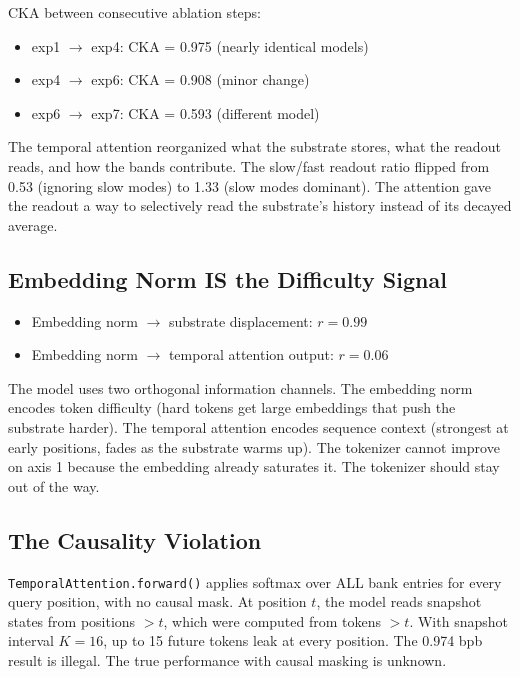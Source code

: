 \documentclass[11pt,a4paper]{report}
\begin{document}
CKA between consecutive ablation steps:

\begin{itemize}[nosep]
\item exp1 $\to$ exp4: CKA = 0.975 (nearly identical models)
\item exp4 $\to$ exp6: CKA = 0.908 (minor change)
\item exp6 $\to$ exp7: CKA = 0.593 (different model)
\end{itemize}

The temporal attention reorganized what the substrate stores, what the readout reads, and how the bands contribute. The slow/fast readout ratio flipped from 0.53 (ignoring slow modes) to 1.33 (slow modes dominant). The attention gave the readout a way to selectively read the substrate's history instead of its decayed average.

\subsection{Embedding Norm IS the Difficulty Signal}

\begin{itemize}[nosep]
\item Embedding norm $\to$ substrate displacement: $r = 0.99$
\item Embedding norm $\to$ temporal attention output: $r = 0.06$
\end{itemize}

The model uses two orthogonal information channels. The embedding norm encodes token difficulty (hard tokens get large embeddings that push the substrate harder). The temporal attention encodes sequence context (strongest at early positions, fades as the substrate warms up). The tokenizer cannot improve on axis 1 because the embedding already saturates it. The tokenizer should stay out of the way.

\subsection{The Causality Violation}

\texttt{TemporalAttention.forward()} applies softmax over ALL bank entries for every query position, with no causal mask. At position $t$, the model reads snapshot states from positions $> t$, which were computed from tokens $> t$. With snapshot interval $K = 16$, up to 15 future tokens leak at every position. The 0.974 bpb result is illegal. The true performance with causal masking is unknown.
\end{document}

